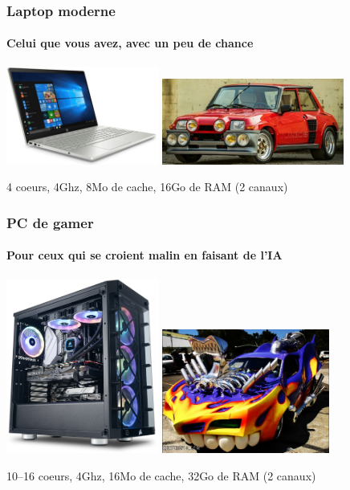 \documentclass[xcolor={x11names,svgnames}]{beamer}
\begin{document}
\begin{frame}
  \frametitle{Laptop moderne}
  \framesubtitle{Celui que vous avez, avec un peu de chance}
  
  \centering
  \includegraphics[width=5cm]{laptop}%
  \includegraphics[width=6cm]{r5maxi}

    \bigskip

  4 coeurs, 4Ghz, 8Mo de cache, 16Go de RAM (2 canaux)
\end{frame}


\begin{frame}
  \frametitle{PC de gamer}
  \framesubtitle{Pour ceux qui se croient malin en faisant de l'IA}
  
  \centering
  \includegraphics[width=5cm]{gamer}%
  \hfill%
  \includegraphics[width=5.5cm]{tuning}

    \bigskip

    10--16 coeurs, 4Ghz, 16Mo de cache, 32Go de RAM (2 canaux)
\end{frame}
\end{document}
